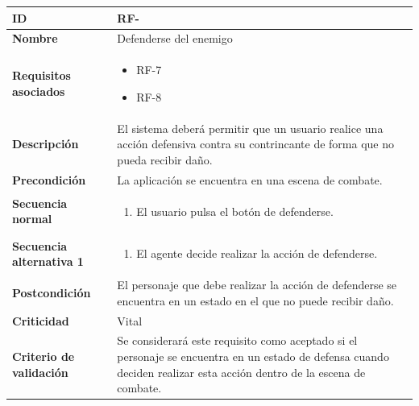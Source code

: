 \begin{center}
	\begin{tabular}{ | p{4.7cm} | p{10cm} | } 
		\hline
		
		\textbf{ID} & RF-\arabic{contador_requisitos_funcionales}
		{contador_requisitos_funcionales} \\
		
		\hline 
		\textbf{Nombre} &
		Defenderse del enemigo\\ 
		
		\hline
		\textbf{Requisitos asociados} & 
		\begin{itemize}
			\item RF-7
			\item RF-8
		\end{itemize}\\
		
		\hline
		\textbf{Descripción} & 
		El sistema deberá permitir que un usuario realice una acción defensiva contra su contrincante de forma que no pueda recibir daño.\\
		
		\hline
		\textbf{Precondición} & 
		La aplicación se encuentra en una escena de combate.\\
		
		\hline
		\textbf{Secuencia normal} &
		\begin{enumerate}
			\item El usuario pulsa el botón de defenderse.
		\end{enumerate}
		\\
		
		\hline
		\textbf{Secuencia alternativa 1} &
		\begin{enumerate}
			\item El agente decide realizar la acción de defenderse.
		\end{enumerate}
		\\
		
		\hline
		\textbf{Postcondición} & 
		El personaje que debe realizar la acción de defenderse se encuentra en un estado en el que no puede recibir daño.\\
		
		\hline 
		\textbf{Criticidad} &
		Vital\\
		
		\hline 
		\textbf{Criterio de validación} & 
		Se considerará este requisito como aceptado si el personaje se encuentra en un estado de defensa cuando deciden realizar esta acción dentro de la escena de combate.\\
		
		\hline
	\end{tabular}
\end{center}

